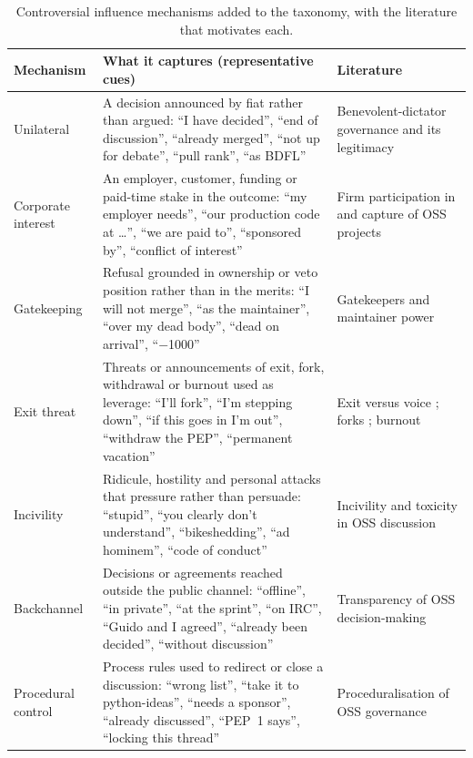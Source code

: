 \documentclass[sigconf,screen]{acmart}
\begin{document}
\begin{table}[t]
\caption{Controversial influence mechanisms added to the taxonomy, with the literature that motivates each.}
\label{tab:controversial}
\small
\begin{tabular}{p{}p{}p{}}
\toprule
Mechanism & What it captures (representative cues) & Literature \\
\midrule
Unilateral & A decision announced by fiat rather than argued: ``I have decided'', ``end of discussion'', ``already merged'', ``not up for debate'', ``pull rank'', ``as BDFL'' & Benevolent-dictator governance and its legitimacy \cite{raymond1999, omahony2007} \\
Corporate interest & An employer, customer, funding or paid-time stake in the outcome: ``my employer needs'', ``our production code at \ldots'', ``we are paid to'', ``sponsored by'', ``conflict of interest'' & Firm participation in and capture of OSS projects \cite{dahlander2005, riehle2007, zhang2020} \\
Gatekeeping & Refusal grounded in ownership or veto position rather than in the merits: ``I will not merge'', ``as the maintainer'', ``over my dead body'', ``dead on arrival'', ``$-$1000'' & Gatekeepers and maintainer power \cite{ducheneaut2005, jensen2007} \\
Exit threat & Threats or announcements of exit, fork, withdrawal or burnout used as leverage: ``I'll fork'', ``I'm stepping down'', ``if this goes in I'm out'', ``withdraw the PEP'', ``permanent vacation'' & Exit versus voice \cite{hirschman1970}; forks \cite{robles2012, gamalielsson2014}; burnout \cite{raman2020} \\
Incivility & Ridicule, hostility and personal attacks that pressure rather than persuade: ``stupid'', ``you clearly don't understand'', ``bikeshedding'', ``ad hominem'', ``code of conduct'' & Incivility and toxicity in OSS discussion \cite{ferreira2021, squire2015, raman2020} \\
Backchannel & Decisions or agreements reached outside the public channel: ``offline'', ``in private'', ``at the sprint'', ``on IRC'', ``Guido and I agreed'', ``already been decided'', ``without discussion'' & Transparency of OSS decision-making \cite{schneider2016, omahony2007} \\
Procedural control & Process rules used to redirect or close a discussion: ``wrong list'', ``take it to python-ideas'', ``needs a sponsor'', ``already discussed'', ``PEP~1 says'', ``locking this thread'' & Proceduralisation of OSS governance \cite{delaat2007, fitzgerald2006} \\
\bottomrule
\end{tabular}
\end{table}
\end{document}
